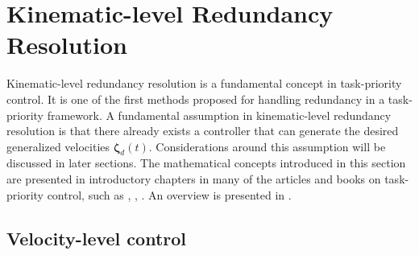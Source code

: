
\section{Kinematic-level Redundancy Resolution}

Kinematic-level redundancy resolution is a fundamental concept in task-priority control.
It is one of the first methods proposed for handling redundancy in a task-priority framework.
A fundamental assumption in kinematic-level redundancy resolution is that there
already exists a controller that can generate the desired generalized velocities \(\bm{\zeta}_d(t)\).
Considerations around this assumption will be discussed in later sections.
The mathematical concepts introduced in this section are presented in introductory
chapters in many of the articles and books on task-priority control, such as
\cite{hanafusa1981}, \cite{nakamura1987}, \cite{khatib1987}. An overview is
presented in \cite{chiaverini1997}.

\subsection{Velocity-level control}
\label{sec:velocity_level_control}

